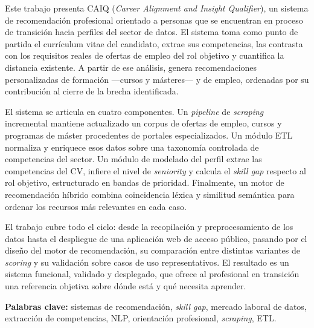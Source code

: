 
Este trabajo presenta CAIQ (\textit{Career Alignment and Insight Qualifier}), un
sistema de recomendación profesional orientado a personas que se encuentran en proceso
de transición hacia perfiles del sector de datos. El sistema toma como punto de
partida el currículum vitae del candidato, extrae sus competencias, las contrasta con
los requisitos reales de ofertas de empleo del rol objetivo y cuantifica la distancia
existente. A partir de ese análisis, genera recomendaciones personalizadas de
formación ---cursos y másteres--- y de empleo, ordenadas por su contribución al cierre
de la brecha identificada.

El sistema se articula en cuatro componentes. Un \textit{pipeline} de \textit{scraping}
incremental mantiene actualizado un corpus de ofertas de empleo, cursos y programas de
máster procedentes de portales especializados. Un módulo ETL normaliza y enriquece esos
datos sobre una taxonomía controlada de competencias del sector. Un módulo de modelado
del perfil extrae las competencias del CV, infiere el nivel de \textit{seniority} y
calcula el \textit{skill gap} respecto al rol objetivo, estructurado en bandas de
prioridad. Finalmente, un motor de recomendación híbrido combina coincidencia léxica y
similitud semántica para ordenar los recursos más relevantes en cada caso.

El trabajo cubre todo el ciclo: desde la recopilación y preprocesamiento de los datos
hasta el despliegue de una aplicación web de acceso público, pasando por el diseño del
motor de recomendación, su comparación entre distintas variantes de \textit{scoring} y
su validación sobre casos de uso representativos. El resultado es un sistema funcional,
validado y desplegado, que ofrece al profesional en transición una referencia objetiva
sobre dónde está y qué necesita aprender.

\vspace{0.4em}
\noindent\textbf{Palabras clave:} sistemas de recomendación, \textit{skill gap},
mercado laboral de datos, extracción de competencias, NLP, orientación profesional,
\textit{scraping}, ETL.

